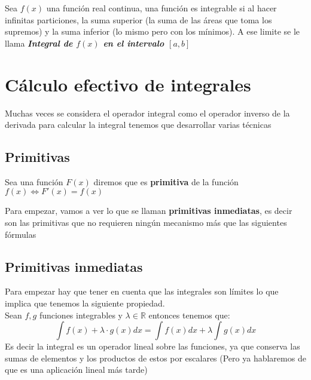 \begin{defi}
Sea $f(x)$ una función real continua, una función es integrable si al hacer infinitas particiones, la suma superior (la suma de las áreas que toma los supremos) y la suma inferior (lo mismo pero con los mínimos). A ese limite se le llama \textit{\textbf{Integral de $f(x)$ en el intervalo $[a,b]$}}
\end{defi}
\newpage
\section{Cálculo efectivo de integrales}
\noindent
Muchas veces se considera el operador integral como el operador inverso de la derivada para calcular la integral tenemos que desarrollar varias técnicas 
\subsection*{Primitivas}
\begin{defi}
Sea una función $F(x)$ diremos que es \textbf{primitiva} de la función $f(x)\Leftrightarrow F'(x)=f(x)$
\end{defi}
\noindent
Para empezar, vamos a ver lo que se llaman \textbf{primitivas inmediatas}, es decir son las primitivas que no requieren ningún mecanismo más que las siguientes fórmulas

\subsection{Primitivas inmediatas}
Para empezar hay que tener en cuenta que las integrales son límites lo que implica que tenemos la siguiente propiedad.\\

Sean $f,g$ funciones integrables y $\lambda \in \mathbb{R}$ entonces tenemos que:
$$
\int f(x)+\lambda\cdot g(x )dx=\int f(x) dx+\lambda\int g(x) dx
$$
\noindent
Es decir la integral es un operador lineal sobre las funciones, ya que conserva las sumas de elementos y los productos de estos por escalares (Pero ya hablaremos de que es una aplicación lineal más tarde)


